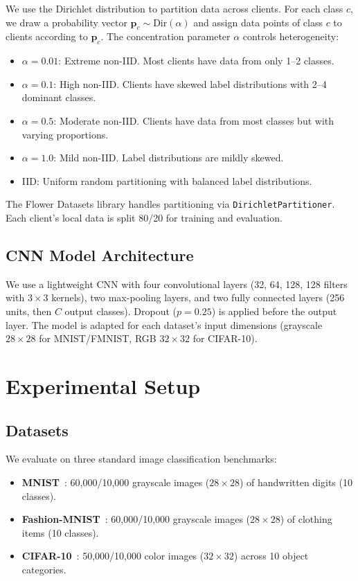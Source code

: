 \documentclass[journal]{IEEEtran}
\begin{document}
We use the Dirichlet distribution to partition data across clients. For each class $c$, we draw a probability vector $\mathbf{p}_c \sim \text{Dir}(\alpha)$ and assign data points of class $c$ to clients according to $\mathbf{p}_c$. The concentration parameter $\alpha$ controls heterogeneity:

\begin{itemize}
    \item $\alpha = 0.01$: Extreme non-IID. Most clients have data from only 1--2 classes.
    \item $\alpha = 0.1$: High non-IID. Clients have skewed label distributions with 2--4 dominant classes.
    \item $\alpha = 0.5$: Moderate non-IID. Clients have data from most classes but with varying proportions.
    \item $\alpha = 1.0$: Mild non-IID. Label distributions are mildly skewed.
    \item IID: Uniform random partitioning with balanced label distributions.
\end{itemize}

The Flower Datasets library handles partitioning via \texttt{DirichletPartitioner}. Each client's local data is split 80/20 for training and evaluation.

\subsection{CNN Model Architecture}

We use a lightweight CNN with four convolutional layers (32, 64, 128, 128 filters with $3 \times 3$ kernels), two max-pooling layers, and two fully connected layers (256 units, then $C$ output classes). Dropout ($p=0.25$) is applied before the output layer. The model is adapted for each dataset's input dimensions (grayscale $28 \times 28$ for MNIST/FMNIST, RGB $32 \times 32$ for CIFAR-10).


\section{Experimental Setup}
\label{sec:setup}

\subsection{Datasets}

We evaluate on three standard image classification benchmarks:
\begin{itemize}
    \item \textbf{MNIST}~\cite{lecun1998gradient}: 60,000/10,000 grayscale images ($28 \times 28$) of handwritten digits (10 classes).
    \item \textbf{Fashion-MNIST}~\cite{xiao2017fashion}: 60,000/10,000 grayscale images ($28 \times 28$) of clothing items (10 classes).
    \item \textbf{CIFAR-10}~\cite{krizhevsky2009learning}: 50,000/10,000 color images ($32 \times 32$) across 10 object categories.
\end{itemize}
\end{document}
